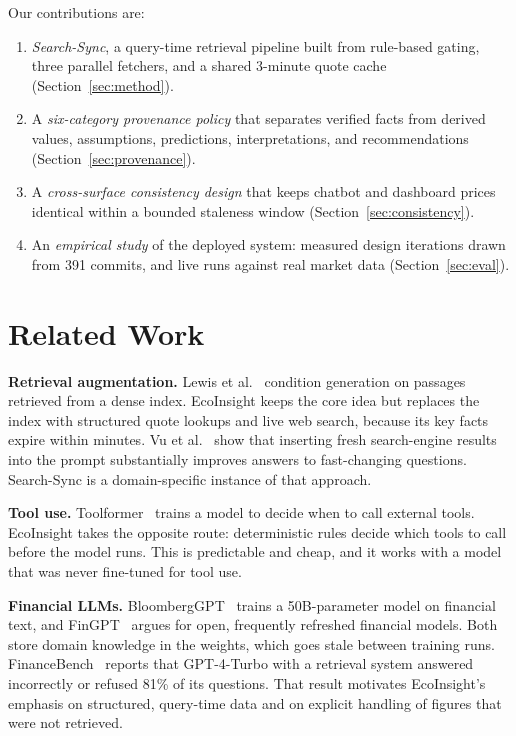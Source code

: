 \documentclass[conference]{IEEEtran}
\begin{document}
Our contributions are:
\begin{enumerate}
\item \emph{Search-Sync}, a query-time retrieval pipeline built from rule-based gating, three parallel fetchers, and a shared 3-minute quote cache (Section~\ref{sec:method}).
\item A \emph{six-category provenance policy} that separates verified facts from derived values, assumptions, predictions, interpretations, and recommendations (Section~\ref{sec:provenance}).
\item A \emph{cross-surface consistency design} that keeps chatbot and dashboard prices identical within a bounded staleness window (Section~\ref{sec:consistency}).
\item An \emph{empirical study} of the deployed system: measured design iterations drawn from 391 commits, and live runs against real market data (Section~\ref{sec:eval}).
\end{enumerate}

\section{Related Work}

\textbf{Retrieval augmentation.} Lewis et al.~\cite{lewis2020rag} condition generation on passages retrieved from a dense index. EcoInsight keeps the core idea but replaces the index with structured quote lookups and live web search, because its key facts expire within minutes. Vu et al.~\cite{vu2023freshllms} show that inserting fresh search-engine results into the prompt substantially improves answers to fast-changing questions. Search-Sync is a domain-specific instance of that approach.

\textbf{Tool use.} Toolformer~\cite{schick2023toolformer} trains a model to decide when to call external tools. EcoInsight takes the opposite route: deterministic rules decide which tools to call before the model runs. This is predictable and cheap, and it works with a model that was never fine-tuned for tool use.

\textbf{Financial LLMs.} BloombergGPT~\cite{wu2023bloomberggpt} trains a 50B-parameter model on financial text, and FinGPT~\cite{yang2023fingpt} argues for open, frequently refreshed financial models. Both store domain knowledge in the weights, which goes stale between training runs. FinanceBench~\cite{islam2023financebench} reports that GPT-4-Turbo with a retrieval system answered incorrectly or refused 81\% of its questions. That result motivates EcoInsight's emphasis on structured, query-time data and on explicit handling of figures that were not retrieved.
\end{document}
